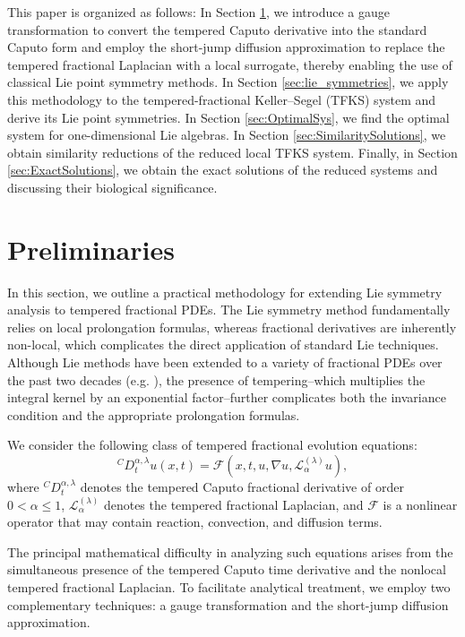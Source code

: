 \documentclass{article}
\begin{document}
\par
This paper is organized as follows: In Section \ref{sec:priliminaries}, we introduce a gauge transformation to convert the tempered Caputo derivative into the standard Caputo form and employ the short-jump diffusion approximation to replace the tempered fractional Laplacian with a local surrogate, thereby enabling the use of classical Lie point symmetry methods. In Section \ref{sec:lie_symmetries}, we apply this methodology to the tempered-fractional Keller--Segel (TFKS) system and derive its Lie point symmetries. In Section \ref{sec:OptimalSys}, we find the optimal system for one-dimensional Lie algebras. In Section \ref{sec:SimilaritySolutions}, we obtain similarity reductions of the reduced local TFKS system. Finally, in Section \ref{sec:ExactSolutions}, we obtain the exact solutions of the reduced systems and discussing their biological significance.


\section{Preliminaries}\label{sec:priliminaries}
In this section, we outline a practical methodology for extending Lie symmetry analysis to tempered fractional PDEs. The Lie symmetry method fundamentally relies on local prolongation formulas, whereas fractional derivatives are inherently non-local, which complicates the direct application of standard Lie techniques. Although Lie methods have been extended to a variety of fractional PDEs over the past two decades (e.g. \cite{Cheviakov2017,Gazizov2009,Liu2024,Soares2024,Yu2024} ), the presence of tempering--which multiplies the integral kernel by an exponential factor--further complicates both the invariance condition and the appropriate prolongation formulas.
\par 
We consider the following class of tempered fractional evolution equations:
\begin{equation*}
{}^{C}D_t^{\alpha , \lambda} u(x,t)=\mathcal{F}\left( x,t,u,\nabla u,\mathcal{L}^{(\lambda)}_\alpha u \right),
\end{equation*}
where ${}^{C}D_t^{\alpha , \lambda}$ denotes the tempered Caputo fractional derivative of order $0<\alpha\le1$, $\mathcal{L}_{\alpha}^{(\lambda)}$ denotes the tempered fractional Laplacian, and $\mathcal{F}$ is a nonlinear operator that may contain reaction, convection, and diffusion terms.
\par 
The principal mathematical difficulty in analyzing such equations arises from the simultaneous presence of the tempered Caputo time derivative and the nonlocal tempered fractional Laplacian. To facilitate analytical treatment, we employ two complementary techniques: a gauge transformation and the short-jump diffusion approximation.
\end{document}
